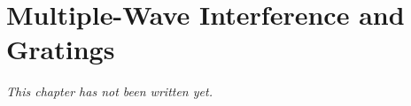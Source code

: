 \chapter{Multiple-Wave Interference and Gratings}\label{ch:b2:gratings}


\emph{This chapter has not been written yet.}
